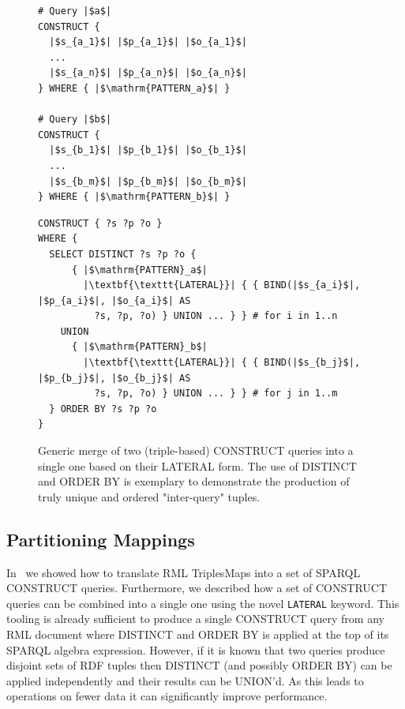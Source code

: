 \begin{figure}[!ht]
\centering

\begin{minipage}[t]{0.38\textwidth}
  \centering
  \begin{verbatim}
# Query |$a$|
CONSTRUCT {
  |$s_{a_1}$| |$p_{a_1}$| |$o_{a_1}$|
  ...
  |$s_{a_n}$| |$p_{a_n}$| |$o_{a_n}$|
} WHERE { |$\mathrm{PATTERN_a}$| }

# Query |$b$|
CONSTRUCT {
  |$s_{b_1}$| |$p_{b_1}$| |$o_{b_1}$|
  ...
  |$s_{b_m}$| |$p_{b_m}$| |$o_{b_m}$|
} WHERE { |$\mathrm{PATTERN_b}$| }
  \end{verbatim}
\end{minipage}
\hfill
\begin{minipage}[t]{0.58\textwidth}
  \centering
  \begin{verbatim}
CONSTRUCT { ?s ?p ?o }
WHERE {
  SELECT DISTINCT ?s ?p ?o {
      { |$\mathrm{PATTERN}_a$|
        |\textbf{\texttt{LATERAL}}| { { BIND(|$s_{a_i}$|, |$p_{a_i}$|, |$o_{a_i}$| AS
          ?s, ?p, ?o) } UNION ... } } # for i in 1..n
    UNION
      { |$\mathrm{PATTERN}_b$|
        |\textbf{\texttt{LATERAL}}| { { BIND(|$s_{b_j}$|, |$p_{b_j}$|, |$o_{b_j}$| AS
          ?s, ?p, ?o) } UNION ... } } # for j in 1..m
  } ORDER BY ?s ?p ?o
}
  \end{verbatim}
\end{minipage}

\caption{Generic merge of two (triple-based) CONSTRUCT queries into a single one based on their LATERAL form. The use of DISTINCT and ORDER BY is exemplary to demonstrate the production of truly unique and ordered "inter-query" tuples.}
\label{fig:combine-lateral}
\end{figure}


\subsection{Partitioning Mappings}
In~ we showed how to translate RML TriplesMaps into a set of SPARQL CONSTRUCT queries. Furthermore, we described how a set of CONSTRUCT queries can be combined into a single one using the novel \texttt{LATERAL} keyword.
This tooling is already sufficient to produce a single CONSTRUCT query from any RML document where DISTINCT and ORDER BY is applied at the top of its SPARQL algebra expression.
However, if it is known that two queries produce disjoint sets of RDF tuples then DISTINCT (and possibly ORDER BY) can be applied independently and their results can be UNION'd. As this leads to operations on fewer data it can significantly improve performance.

